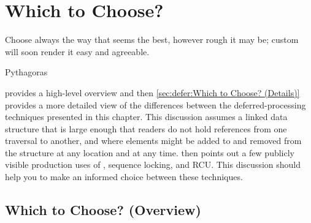 
\section{Which to Choose?}
\label{sec:defer:Which to Choose?}
%
\epigraph{Choose always the way that seems the best, however rough it
	  may be; custom will soon render it easy and agreeable.}
	  {Pythagoras}

provides a high-level overview and then
\cref{sec:defer:Which to Choose? (Details)}
provides a more detailed view
of the differences between the deferred-processing techniques presented
in this chapter.
This discussion assumes a linked data structure that is large enough
that readers do not hold references from one traversal to another,
and where elements might be added to and removed from the structure
at any location and at any time.
then points out a few publicly visible production uses of
, sequence locking, and RCU\@.
This discussion should help you to make an informed choice between
these techniques.

\subsection{Which to Choose?
			      (Overview)}
\label{sec:defer:Which to Choose? (Overview)}

\begin{table*}
\renewcommand*{\arraystretch}{1.25}
\footnotesize
\centering\OneColumnHSpace{-.3in}
\caption{Which Deferred Technique to Choose?
					     (Overview)}
\label{tab:defer:Which Deferred Technique to Choose? (Overview)}
\end{table*}

